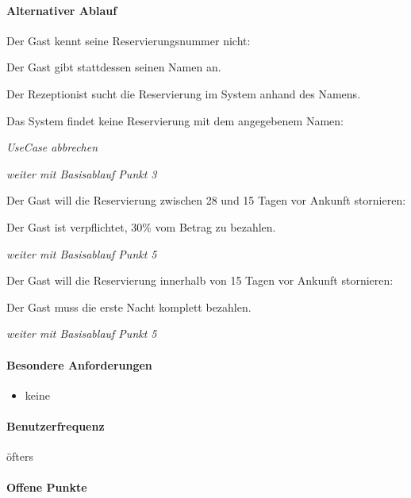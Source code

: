 \paragraph{Alternativer Ablauf}
\begin{longenum}
	\item
	\begin{longenum}
		\item Der \Gls{Gast} kennt seine \Gls{Reservierungsnummer} nicht:
		\begin{longenum}
			\item Der \Gls{Gast} gibt stattdessen seinen Namen an.
			\item Der \Gls{Rezeptionist} sucht die \Gls{Reservierung} im System anhand des Namens.
			\begin{longenum}
				\item Das System findet keine \Gls{Reservierung} mit dem angegebenem Namen:
				\begin{longenum}
					\item \emph{UseCase abbrechen}
				\end{longenum}
			\end{longenum}
			\item \emph{weiter mit Basisablauf Punkt 3}
		\end{longenum}
	\end{longenum}
	
	\item
	\item
	\item
	\begin{longenum}
		\item Der \Gls{Gast} will die \Gls{Reservierung} zwischen 28 und 15 Tagen vor Ankunft stornieren:
		\begin{longenum}
			\item Der \Gls{Gast} ist verpflichtet, 30\% vom Betrag zu bezahlen.
			\item \emph{weiter mit Basisablauf Punkt 5}
		\end{longenum}
		\item Der \Gls{Gast} will die \Gls{Reservierung} innerhalb von 15 Tagen vor Ankunft stornieren:
		\begin{longenum}
			\item Der \Gls{Gast} muss die erste Nacht komplett bezahlen.
			\item \emph{weiter mit Basisablauf Punkt 5}
		\end{longenum}
	\end{longenum}
	
	\item
\end{longenum}

\paragraph{Besondere Anforderungen}
\begin{itemize}
	\item keine
\end{itemize}

\paragraph{Benutzerfrequenz}
öfters

\paragraph{Offene Punkte}

\newpage
